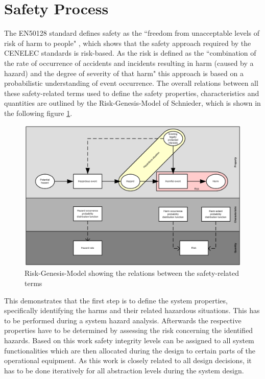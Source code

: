 \documentclass{template/openetcs_article}
\begin{document}

\section{Safety Process}

The EN50128 standard defines safety as the ``freedom from unacceptable levels of risk of harm to people" \cite{EN50128:2011}, which shows that the safety approach required by the CENELEC standards is risk-based. As the risk is defined as the ``combination of the rate of occurrence of accidents and incidents resulting in harm (caused by a hazard) and the degree of severity  of that harm" \cite{EN50128:2011} this approach is based on a probabilistic understanding of event occurrence. The overall relations between all these safety-related terms used to define the safety properties, characteristics and quantities are outlined by the Risk-Genesis-Model of Schnieder, which is shown in the following figure \ref{fig:Risiko-Genese-Modell-eng}.

\begin{figure}[htbp]
\centering
\includegraphics[width=0.7\linewidth]{bld_2013-06-19_Risiko-Genese-Modell-eng-2-0_jw}
\caption{Risk-Genesis-Model showing the relations between the safety-related terms \cite{Schnieder.2010}}
\label{fig:Risiko-Genese-Modell-eng}
\end{figure}

This demonstrates that the first step is to define the system properties, specifically identifying the harms and their related hazardous situations. This has to be performed during a system hazard analysis. Afterwards the respective properties have to be determined by assessing the risk concerning the identified hazards. Based on this work safety integrity levels can be assigned to all system functionalities which are then allocated during the design to certain parts of the operational equipment. As this work is closely related to all design decisions, it has to be done iteratively for all abstraction levels during the system design. 
\end{document}
